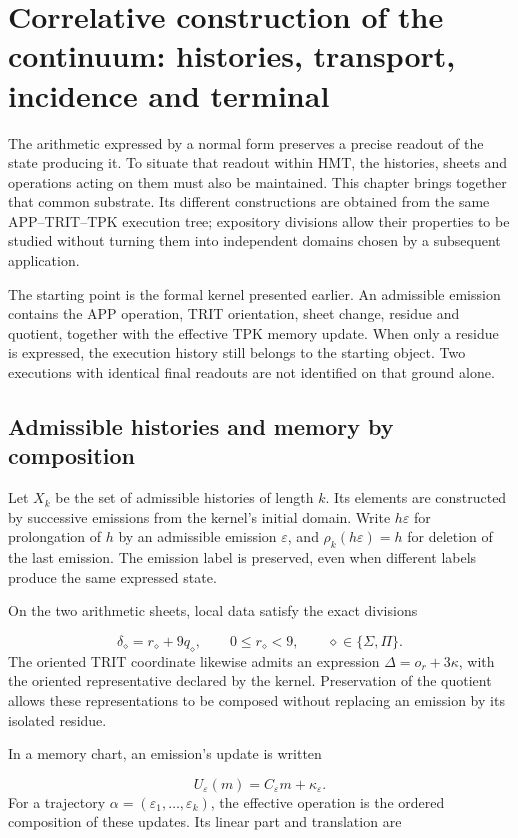 \section{Correlative construction of the continuum: histories, transport, incidence and terminal}
\label{iv:continuo-conjunto}
The arithmetic expressed by a normal form preserves a precise readout of the state producing it. To situate that readout within HMT, the histories, sheets and operations acting on them must also be maintained. This chapter brings together that common substrate. Its different constructions are obtained from the same APP–TRIT–TPK execution tree; expository divisions allow their properties to be studied without turning them into independent domains chosen by a subsequent application.

The starting point is the formal kernel presented earlier. An admissible emission contains the APP operation, TRIT orientation, sheet change, residue and quotient, together with the effective TPK memory update. When only a residue is expressed, the execution history still belongs to the starting object. Two executions with identical final readouts are not identified on that ground alone.

\subsection{Admissible histories and memory by composition}
\label{iv:cont:historias}
Let \(X_k\) be the set of admissible histories of length \(k\). Its elements are constructed by successive emissions from the kernel's initial domain. Write \(h\varepsilon\) for prolongation of \(h\) by an admissible emission \(\varepsilon\), and \(\rho_k(h\varepsilon)=h\) for deletion of the last emission. The emission label is preserved, even when different labels produce the same expressed state.

On the two arithmetic sheets, local data satisfy the exact divisions

\[
\delta_\diamond=r_\diamond+9q_\diamond,
\qquad 0\leq r_\diamond<9,
\qquad \diamond\in\{\Sigma,\Pi\}.
\]
The oriented TRIT coordinate likewise admits an expression \(\Delta=o_r+3\kappa\), with the oriented representative declared by the kernel. Preservation of the quotient allows these representations to be composed without replacing an emission by its isolated residue.

In a memory chart, an emission's update is written

\[
U_\varepsilon(m)=C_\varepsilon m+\kappa_\varepsilon.
\]
For a trajectory \(\alpha=(\varepsilon_1,\ldots,\varepsilon_k)\), the effective operation is the ordered composition of these updates. Its linear part and translation are

